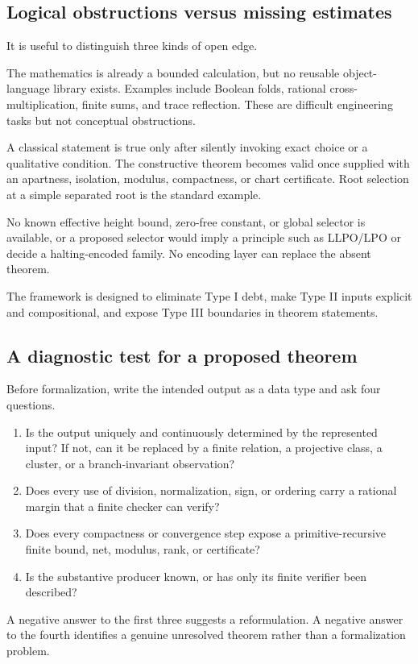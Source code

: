 \subsection{Logical obstructions versus missing estimates}

It is useful to distinguish three kinds of open edge.

\begin{description}[style=nextline]
\item[Type I: finite formalization debt.]  The mathematics is already a bounded calculation, but no reusable object-language library exists.  Examples include Boolean folds, rational cross-multiplication, finite sums, and trace reflection.  These are difficult engineering tasks but not conceptual obstructions.

\item[Type II: missing quantitative hypotheses.]  A classical statement is true only after silently invoking exact choice or a qualitative condition.  The constructive theorem becomes valid once supplied with an apartness, isolation, modulus, compactness, or chart certificate.  Root selection at a simple separated root is the standard example.

\item[Type III: missing mathematics or genuine nonuniformity.]  No known effective height bound, zero-free constant, or global selector is available, or a proposed selector would imply a principle such as LLPO/LPO or decide a halting-encoded family.  No encoding layer can replace the absent theorem.
\end{description}

The framework is designed to eliminate Type I debt, make Type II inputs explicit and compositional, and expose Type III boundaries in theorem statements.

\subsection{A diagnostic test for a proposed theorem}

Before formalization, write the intended output as a data type and ask four questions.

\begin{enumerate}[label=\arabic*.]
\item Is the output uniquely and continuously determined by the represented input?  If not, can it be replaced by a finite relation, a projective class, a cluster, or a branch-invariant observation?
\item Does every use of division, normalization, sign, or ordering carry a rational margin that a finite checker can verify?
\item Does every compactness or convergence step expose a primitive-recursive finite bound, net, modulus, rank, or certificate?
\item Is the substantive producer known, or has only its finite verifier been described?
\end{enumerate}
A negative answer to the first three suggests a reformulation.  A negative answer to the fourth identifies a genuine unresolved theorem rather than a formalization problem.

